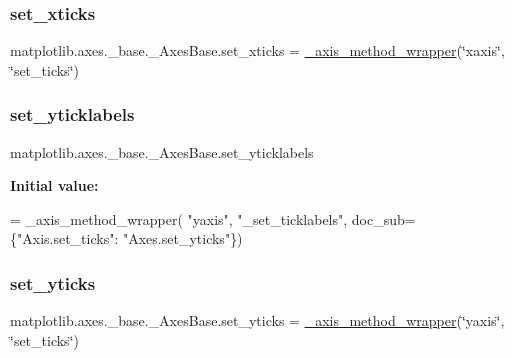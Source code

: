 \subsubsection{\texorpdfstring{set\+\_\+xticks}{set\_xticks}}
{\footnotesize\ttfamily matplotlib.\+axes.\+\_\+base.\+\_\+\+Axes\+Base.\+set\+\_\+xticks = \hyperlink{classmatplotlib_1_1axes_1_1__base_1_1__axis__method__wrapper}{\+\_\+axis\+\_\+method\+\_\+wrapper}(\char`\"{}xaxis\char`\"{}, \char`\"{}set\+\_\+ticks\char`\"{})\hspace{0.3cm}{\ttfamily [static]}}

\mbox{\label{classmatplotlib_1_1axes_1_1__base_1_1__AxesBase_a5e610c7658e7284dffa0a4b115a50ce7}} 
\subsubsection{\texorpdfstring{set\+\_\+yticklabels}{set\_yticklabels}}
{\footnotesize\ttfamily matplotlib.\+axes.\+\_\+base.\+\_\+\+Axes\+Base.\+set\+\_\+yticklabels\hspace{0.3cm}{\ttfamily [static]}}

{\bfseries Initial value\+:}
\begin{DoxyCode}
=  \_axis\_method\_wrapper(
        \textcolor{stringliteral}{"yaxis"}, \textcolor{stringliteral}{"\_set\_ticklabels"},
        doc\_sub=\{\textcolor{stringliteral}{"Axis.set\_ticks"}: \textcolor{stringliteral}{"Axes.set\_yticks"}\})
\end{DoxyCode}
\mbox{\label{classmatplotlib_1_1axes_1_1__base_1_1__AxesBase_a3b6bd0b3ad7207dcd8f283a43b769a70}} 
\subsubsection{\texorpdfstring{set\+\_\+yticks}{set\_yticks}}
{\footnotesize\ttfamily matplotlib.\+axes.\+\_\+base.\+\_\+\+Axes\+Base.\+set\+\_\+yticks = \hyperlink{classmatplotlib_1_1axes_1_1__base_1_1__axis__method__wrapper}{\+\_\+axis\+\_\+method\+\_\+wrapper}(\char`\"{}yaxis\char`\"{}, \char`\"{}set\+\_\+ticks\char`\"{})\hspace{0.3cm}{\ttfamily [static]}}

